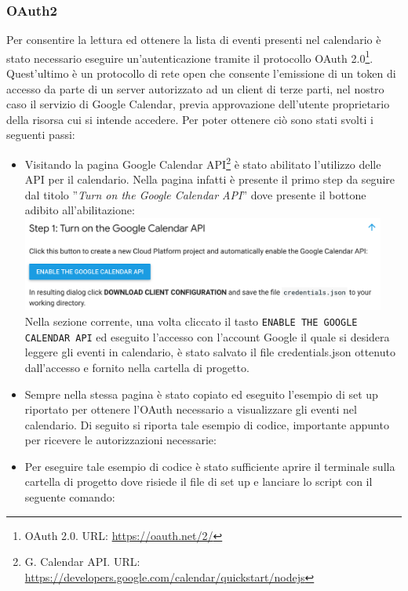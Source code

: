 \subsubsection{OAuth2}
Per consentire la lettura ed ottenere la lista di eventi presenti nel calendario è stato necessario eseguire un'autenticazione tramite il protocollo OAuth 2.0\footnote{OAuth 2.0. URL: \href{https://oauth.net/2/}{https://oauth.net/2/}}. Quest'ultimo è un protocollo di rete open che consente l'emissione di un token di accesso da parte di un server autorizzato ad un client di terze parti, nel nostro caso il servizio di Google Calendar, previa approvazione dell'utente proprietario della risorsa cui si intende accedere. Per poter ottenere ciò sono stati svolti i seguenti passi:
\begin{itemize}
    \item Visitando la pagina Google Calendar API\footnote{G. Calendar API. URL: \href{https://developers.google.com/calendar/quickstart/nodejs}{https://developers.google.com/calendar/quickstart/nodejs}} è stato abilitato l'utilizzo delle API per il calendario. Nella pagina infatti è presente il primo step da seguire dal titolo ”\textit{Turn on the Google Calendar API}” dove presente il bottone adibito all'abilitazione:\\
    \includegraphics[width=12cm]{immagini/google_calendar_api.png}\\[2cm]
    Nella sezione corrente, una volta cliccato il tasto \texttt{ENABLE THE GOOGLE CALENDAR API} ed eseguito l’accesso con l’account Google il quale si desidera leggere gli eventi in calendario, è stato salvato il file credentials.json ottenuto dall'accesso e fornito nella cartella di progetto.
    \item Sempre nella stessa pagina è stato copiato ed eseguito l'esempio di set up riportato per ottenere l’OAuth necessario a visualizzare gli eventi nel calendario. Di seguito si riporta tale esempio di codice, importante appunto per ricevere le autorizzazioni necessarie:\\[0.1cm]
	
	\item Per eseguire tale esempio di codice è stato sufficiente aprire il terminale sulla cartella di progetto dove risiede il file di set up e lanciare lo script con il seguente comando:

\end{itemize}
